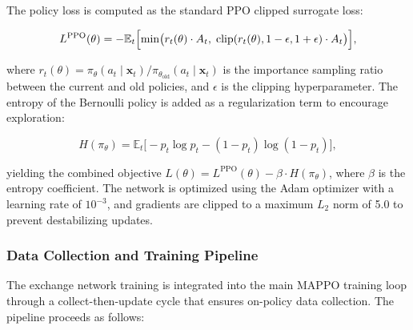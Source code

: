 The policy loss is computed as the standard PPO clipped surrogate loss:

\begin{equation}
    L^{\text{PPO}}(\theta) = -\mathbb{E}_{t}\Bigl[\min\bigl(r_t(\theta) \cdot A_t,\; \text{clip}(r_t(\theta), 1-\epsilon, 1+\epsilon) \cdot A_t\bigr)\Bigr],
\end{equation}

where $r_t(\theta) = \pi_\theta(a_t \mid \mathbf{x}_t) / \pi_{\theta_{\text{old}}}(a_t \mid \mathbf{x}_t)$ is the importance sampling ratio between the current and old policies, and $\epsilon$ is the clipping hyperparameter. The entropy of the Bernoulli policy is added as a regularization term to encourage exploration:

\begin{equation}
    H(\pi_\theta) = \mathbb{E}_{t}\bigl[ -p_t \log p_t - (1-p_t) \log(1-p_t) \bigr],
\end{equation}

yielding the combined objective $L(\theta) = L^{\text{PPO}}(\theta) - \beta \cdot H(\pi_\theta)$, where $\beta$ is the entropy coefficient. The network is optimized using the Adam optimizer with a learning rate of $10^{-3}$, and gradients are clipped to a maximum $L_2$ norm of 5.0 to prevent destabilizing updates.

\subsubsection{Data Collection and Training Pipeline}

The exchange network training is integrated into the main MAPPO training loop through a collect-then-update cycle that ensures on-policy data collection. The pipeline proceeds as follows:

